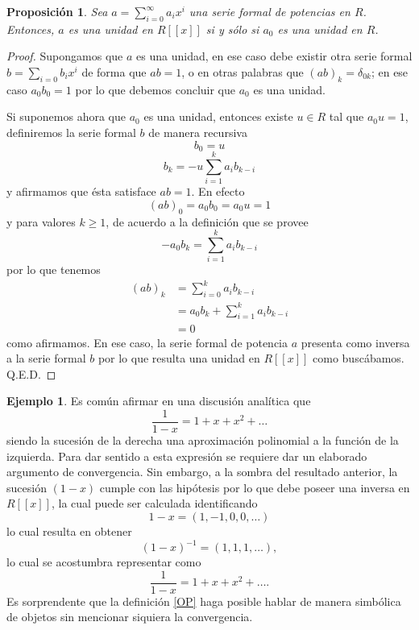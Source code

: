 \documentclass[letter,10pt,notitlepage]{amsart}
\newtheorem{proposition}{Proposición}
\theoremstyle{definition}
\newtheorem*{example}{Ejemplo}
\theoremstyle{remark}
\begin{document}
\begin{proposition}
  \label{PR}
  Sea \( a = \sum_{i=0}^{\infty}a_ix^i\) una serie 
  formal de potencias en \( R\). Entonces, \( a\) es una 
  unidad en \( R\left[[x]\right]\) si y sólo si \( a_0\) es 
  una unidad en \( R\).
\end{proposition}
\begin{proof}
  Supongamos que \( a\) es una unidad, en ese caso debe existir 
  otra serie formal \( b = \sum_{i=0}b_ix^i \) de forma 
  que \( ab = 1\), o en otras palabras que 
  \( (a b)_k = \delta_{0k}\); en ese caso \( a_0 b_0 = 1\) por 
  lo que debemos concluir que \( a_0\) es una unidad.

  Si suponemos ahora que \( a_0\) es una unidad, entonces 
  existe \( u \in R\) tal que \( a_0 u= 1\),  definiremos la 
  serie formal  \( b\) de manera recursiva  
  \[ b_0 = u\]
  \[ b_{k} = -u \sum_{i=1}^{k}a_ib_{k-i} \]
  y afirmamos que ésta satisface \( a b = 1 \). En efecto
  \[ (ab)_0 = a_0b_0 = a_0u = 1\] 
  y para valores \( k\geq 1\), 
  de acuerdo a la definición que se provee 
  \[  -a_0b_k = \sum_{i=1}^{k}a_ib_{k-i} \]
  por lo que tenemos 
  \begin{align*}
    (ab)_k &= \sum_{i=0}^{k}a_{i}b_{k-i} \\
    	& = a_0b_k+ \sum_{i=1}^{k}a_{i}b_{k-i} \\
	& = 0
  \end{align*}
  como afirmamos. En ese caso, la serie formal de potencia 
  \( a\) presenta como inversa a la serie formal \( b\) por 
  lo que resulta una unidad en \( R\left[[x]\right]\)
  como buscábamos. Q.E.D.
\end{proof} 

\begin{example}
  Es común afirmar en una
  discusión analítica que
  \[ \frac{1}{1-x} = 1 + x + x^2 + \dots\]
  siendo la sucesión de la derecha una aproximación
  polinomial a la función de la izquierda. Para dar
  sentido a esta expresión se requiere dar un elaborado
  argumento de convergencia. Sin embargo, 
  a la sombra del resultado anterior, la sucesión
  \( (1-x)\) cumple con las hipótesis por lo que debe
  poseer una inversa en \( R\left[ [x] \right]\),
  la cual puede ser calculada identificando
  \[ 1 - x = (1,-1,0,0,\dots)\]
  lo cual resulta en obtener
  \[ (1-x)^{-1} = (1, 1, 1, \dots),\]
  lo cual se acostumbra representar como
  \[ \frac{1}{1-x} = 1 + x + x^2 + \dots.\]
  Es sorprendente que la definición \ref{OP} haga 
  posible hablar de manera simbólica de objetos sin
  mencionar siquiera la convergencia.
\end{example}
\end{document}
